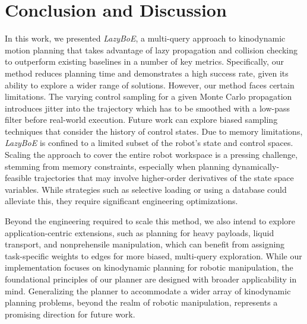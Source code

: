 

\section{Conclusion and Discussion}\label{sec:discussion}

In this work, we presented \textsl{LazyBoE}, a multi-query approach to kinodynamic motion planning that takes advantage of lazy propagation and collision checking to outperform existing baselines in a number of key metrics. Specifically, our method reduces planning time and demonstrates a high success rate, given its ability to explore a wider range of solutions.
However, our method faces certain limitations. The varying control sampling for a given Monte Carlo propagation introduces jitter into the trajectory which has to be smoothed with a low-pass filter before real-world execution. Future work can explore biased sampling techniques that consider the history of control states.
Due to memory limitations, \textsl{LazyBoE} is confined to a limited subset of the robot's state and control spaces.
Scaling the approach to cover the entire robot workspace is a pressing challenge, stemming from memory constraints, especially when planning dynamically-feasible trajectories that may involve higher-order derivatives of the state space variables. While strategies such as selective loading or using a database could alleviate this, they require significant engineering optimizations.

Beyond the engineering required to scale this method, we also intend to explore
application-centric extensions, such as planning for heavy payloads, liquid transport, and nonprehensile manipulation,
which can benefit from assigning task-specific weights to edges for more biased, multi-query exploration.
While our implementation focuses on kinodynamic planning for robotic manipulation, the foundational principles of our planner are designed with broader applicability in mind. Generalizing the planner to accommodate a wider array of kinodynamic planning problems, beyond the realm of robotic manipulation, represents a promising direction for future work.
